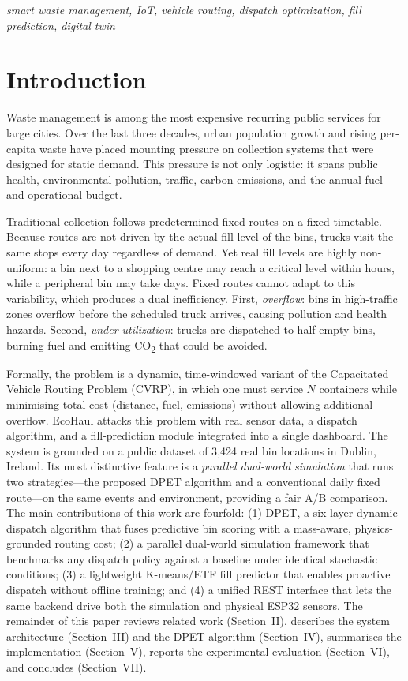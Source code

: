 \documentclass[conference, a4paper]{IEEEtran}
\begin{document}
\renewcommand{\IEEEkeywordsname}{Keywords}
\begin{IEEEkeywords}
\itshape smart waste management, IoT, vehicle routing, dispatch optimization, fill prediction, digital twin
\end{IEEEkeywords}

\section{Introduction}
Waste management is among the most expensive recurring public services for large cities. Over the last three decades, urban population growth and rising per-capita waste have placed mounting pressure on collection systems that were designed for static demand. This pressure is not only logistic: it spans public health, environmental pollution, traffic, carbon emissions, and the annual fuel and operational budget.

Traditional collection follows predetermined fixed routes on a fixed timetable. Because routes are not driven by the actual fill level of the bins, trucks visit the same stops every day regardless of demand. Yet real fill levels are highly non-uniform: a bin next to a shopping centre may reach a critical level within hours, while a peripheral bin may take days. Fixed routes cannot adapt to this variability, which produces a dual inefficiency. First, \textit{overflow}: bins in high-traffic zones overflow before the scheduled truck arrives, causing pollution and health hazards. Second, \textit{under-utilization}: trucks are dispatched to half-empty bins, burning fuel and emitting CO\textsubscript{2} that could be avoided.

Formally, the problem is a dynamic, time-windowed variant of the Capacitated Vehicle Routing Problem (CVRP), in which one must service $N$ containers while minimising total cost (distance, fuel, emissions) without allowing additional overflow. EcoHaul attacks this problem with real sensor data, a dispatch algorithm, and a fill-prediction module integrated into a single dashboard. The system is grounded on a public dataset of 3{,}424 real bin locations in Dublin, Ireland. Its most distinctive feature is a \textit{parallel dual-world simulation} that runs two strategies---the proposed DPET algorithm and a conventional daily fixed route---on the same events and environment, providing a fair A/B comparison. The main contributions of this work are fourfold: (1) DPET, a six-layer dynamic dispatch algorithm that fuses predictive bin scoring with a mass-aware, physics-grounded routing cost; (2) a parallel dual-world simulation framework that benchmarks any dispatch policy against a baseline under identical stochastic conditions; (3) a lightweight K-means/ETF fill predictor that enables proactive dispatch without offline training; and (4) a unified REST interface that lets the same backend drive both the simulation and physical ESP32 sensors. The remainder of this paper reviews related work (Section~II), describes the system architecture (Section~III) and the DPET algorithm (Section~IV), summarises the implementation (Section~V), reports the experimental evaluation (Section~VI), and concludes (Section~VII).
\end{document}
